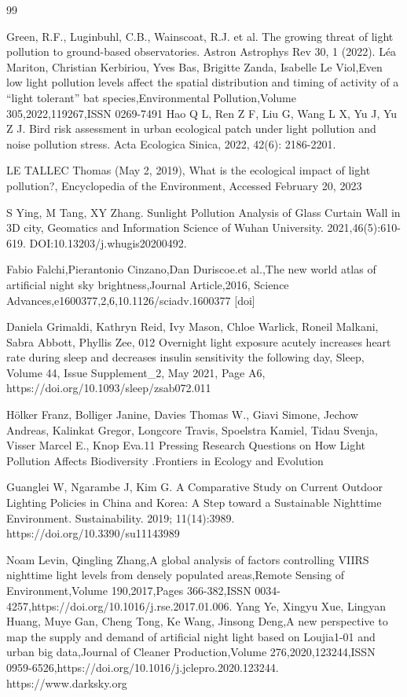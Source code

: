 \documentclass[12pt]{article}
\begin{document}
\clearpage
{}
\begin{thebibliography}{99}
	
	Green, R.F., Luginbuhl, C.B., Wainscoat, R.J. et al. The growing threat of light pollution to ground-based observatories. Astron Astrophys Rev 30, 1 (2022). 
	Léa Mariton, Christian Kerbiriou, Yves Bas, Brigitte Zanda, Isabelle Le Viol,Even low light pollution levels affect the spatial distribution and timing of activity of a “light tolerant” bat species,Environmental Pollution,Volume 305,2022,119267,ISSN 0269-7491
	Hao Q L, Ren Z F, Liu G, Wang L X, Yu J, Yu Z J. Bird risk assessment in urban ecological patch under light pollution and noise pollution stress. Acta Ecologica Sinica, 2022, 42(6): 2186-2201.
 
 
 
 LE TALLEC Thomas (May 2, 2019), What is the ecological impact of light pollution?, Encyclopedia of the Environment, Accessed February 20, 2023


S Ying, M Tang, XY Zhang. Sunlight Pollution Analysis of Glass Curtain Wall in 3D city, Geomatics and Information Science of Wuhan University. 2021,46(5):610-619. DOI:10.13203/j.whugis20200492.

Fabio Falchi,Pierantonio Cinzano,Dan Duriscoe.et al.,The new world atlas of artificial night sky brightness,Journal Article,2016, Science Advances,e1600377,2,6,10.1126/sciadv.1600377 [doi]

Daniela Grimaldi, Kathryn Reid, Ivy Mason, Chloe Warlick, Roneil Malkani, Sabra Abbott, Phyllis Zee, 012 Overnight light exposure acutely increases heart rate during sleep and decreases insulin sensitivity the following day, Sleep, Volume 44, Issue Supplement\_2, May 2021, Page A6, https://doi.org/10.1093/sleep/zsab072.011

Hölker Franz, Bolliger Janine, Davies Thomas W., Giavi Simone, Jechow Andreas, Kalinkat Gregor, Longcore Travis, Spoelstra Kamiel, Tidau Svenja, Visser Marcel E., Knop Eva.11 Pressing Research Questions on How Light Pollution Affects Biodiversity .Frontiers in Ecology and Evolution

Guanglei W, Ngarambe J, Kim G. A Comparative Study on Current Outdoor Lighting Policies in China and Korea: A Step toward a Sustainable Nighttime Environment. Sustainability. 2019; 11(14):3989. https://doi.org/10.3390/su11143989

Noam Levin, Qingling Zhang,A global analysis of factors controlling VIIRS nighttime light levels from densely populated areas,Remote Sensing of Environment,Volume 190,2017,Pages 366-382,ISSN 0034-4257,https://doi.org/10.1016/j.rse.2017.01.006.
Yang Ye, Xingyu Xue, Lingyan Huang, Muye Gan, Cheng Tong, Ke Wang, Jinsong Deng,A new perspective to map the supply and demand of artificial night light based on Loujia1-01 and urban big data,Journal of Cleaner Production,Volume 276,2020,123244,ISSN 0959-6526,https://doi.org/10.1016/j.jclepro.2020.123244.
https://www.darksky.org
\end{thebibliography}
\clearpage
\end{document}
